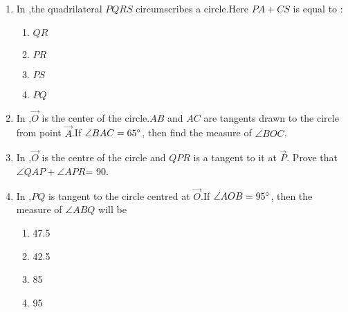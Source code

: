 \begin{enumerate}
	\item In ,the quadrilateral $PQRS$ circumscribes a circle.Here $PA+CS$ is equal to : 

\begin{figure}[H]
	        \centering
		
		\caption{}
		\label{fig.circle1}
\end{figure}
  \begin{enumerate}
  \item$QR$  \item$PR$
  \item$PS$  \item$PQ$
  \end{enumerate}	  




  \item In ,$\vec{O}$ is the center of the circle.$AB$ and $AC$ are tangents drawn to the circle from point $\vec{ A}$.If $\angle BAC=65\degree$, then find the measure of $\angle BOC$.


	\begin{center}
\begin{figure}[H]
	        \centering
	        
		\caption{}
		\label{fig.circle2}
        \end{figure}
	\end{center}




\item In ,$\vec{ O}$ is the centre of the circle and $QPR$ is a tangent to it at $\vec{ P}$. Prove that $\angle QAP+ \angle APR$= 90\degree.
\begin{figure}[H]
	        \centering
	        
		\caption{}
		\label{fig.circle3}

        \end{figure}





\item In ,$PQ$ is tangent to the circle centred at $\vec{ O}$.If $\angle AOB= 95\degree$, then the measure of $\angle ABQ$ will be
\begin{figure}[H]
	        \centering
	        
		\caption{}
		\label{fig.circle4}
        \end{figure}


\begin{enumerate}
  \item 47.5\degree  \item42.5\degree
  \item85\degree    \item95\degree	  
\end{enumerate}






\end{enumerate}
